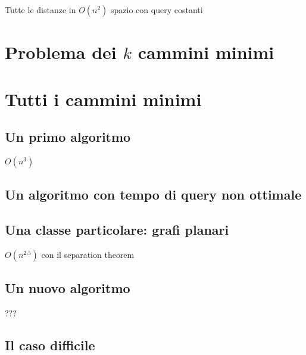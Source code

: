 \documentclass[a4paper,10pt]{amsbook}
\theoremstyle{plain}
\theoremstyle{definition}
\theoremstyle{remark}
\begin{document}
Tutte le distanze in $O(n^2)$ spazio con query costanti




\chapter{Problema dei $k$ cammini minimi}



\chapter{Tutti i cammini minimi}

\section{Un primo algoritmo}

$O(n^3)$

\section{Un algoritmo con tempo di query non ottimale}


\section{Una classe particolare: grafi planari}

$O(n^{2.5})$ con il separation theorem

\section{Un nuovo algoritmo}

???

\section{Il caso difficile}
\end{document}
